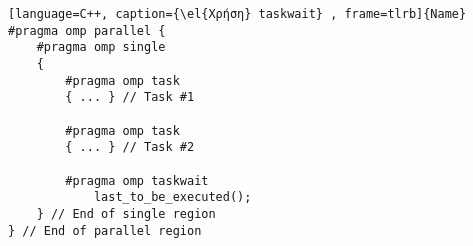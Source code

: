 \begin{spacing}{1.0}
\begin{lstlisting}[language=C++, caption={\el{Χρήση} taskwait} , frame=tlrb]{Name}
#pragma omp parallel {
	#pragma omp single
	{
		#pragma omp task
		{ ... } // Task #1

		#pragma omp task
		{ ... } // Task #2

		#pragma omp taskwait
			last_to_be_executed();
	} // End of single region
} // End of parallel region
\end{lstlisting}
\end{spacing}
